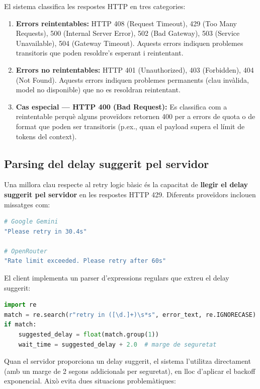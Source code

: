 \documentclass[12pt,a4paper,twoside]{report}
\begin{document}
El sistema classifica les respostes HTTP en tres categories:

\begin{enumerate}
    \item \textbf{Errors reintentables:} HTTP 408 (Request Timeout), 429 (Too Many Requests), 500 (Internal Server Error), 502 (Bad Gateway), 503 (Service Unavailable), 504 (Gateway Timeout). Aquests errors indiquen problemes transitoris que poden resoldre's esperant i reintentant.
    \item \textbf{Errors no reintentables:} HTTP 401 (Unauthorized), 403 (Forbidden), 404 (Not Found). Aquests errors indiquen problemes permanents (clau inv\`alida, model no disponible) que no es resoldran reintentant.
    \item \textbf{Cas especial --- HTTP 400 (Bad Request):} Es classifica com a reintentable perqu\`e alguns prove\"idors retornen 400 per a errors de quota o de format que poden ser transitoris (p.ex., quan el payload supera el l\'imit de tokens del context).
\end{enumerate}

\subsection{Parsing del delay suggerit pel servidor}

Una millora clau respecte al retry logic b\`asic \'es la capacitat de \textbf{llegir el delay suggerit pel servidor} en les respostes HTTP 429. Diferents prove\"idors inclouen missatges com:

\begin{lstlisting}[language=bash]
# Google Gemini
"Please retry in 30.4s"

# OpenRouter  
"Rate limit exceeded. Please retry after 60s"
\end{lstlisting}

El client implementa un parser d'expressions regulars que extreu el delay suggerit:

\begin{lstlisting}[language=Python]
import re
match = re.search(r"retry in ([\d.]+)\s*s", error_text, re.IGNORECASE)
if match:
    suggested_delay = float(match.group(1))
    wait_time = suggested_delay + 2.0  # marge de seguretat
\end{lstlisting}

Quan el servidor proporciona un delay suggerit, el sistema l'utilitza directament (amb un marge de 2 segons addicionals per seguretat), en lloc d'aplicar el backoff exponencial. Aix\`o evita dues situacions problem\`atiques:
\end{document}
